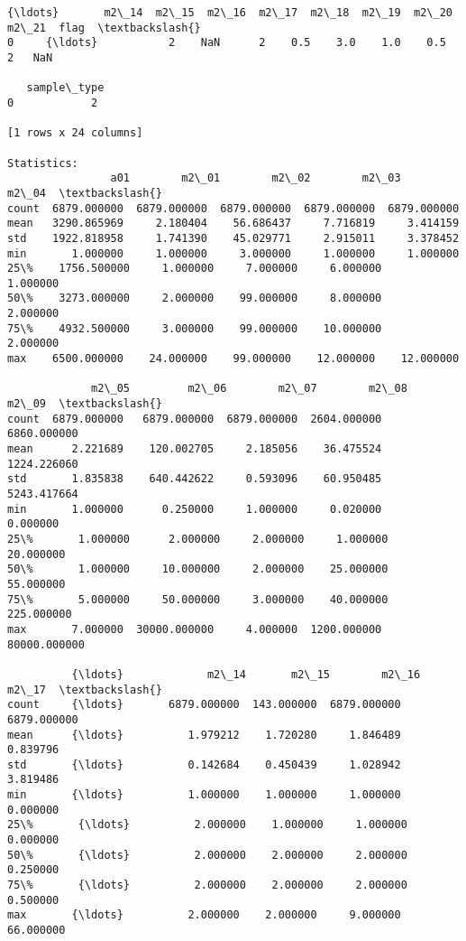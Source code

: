 \documentclass[11pt]{article}
\begin{document}
\begin{Verbatim}[commandchars=\\\{\}]
      {\ldots}       m2\_14  m2\_15  m2\_16  m2\_17  m2\_18  m2\_19  m2\_20  m2\_21  flag  \textbackslash{}
0     {\ldots}           2    NaN      2    0.5    3.0    1.0    0.5      2   NaN   

   sample\_type  
0            2  

[1 rows x 24 columns]

Statistics: 
                a01        m2\_01        m2\_02        m2\_03        m2\_04  \textbackslash{}
count  6879.000000  6879.000000  6879.000000  6879.000000  6879.000000   
mean   3290.865969     2.180404    56.686437     7.716819     3.414159   
std    1922.818958     1.741390    45.029771     2.915011     3.378452   
min       1.000000     1.000000     3.000000     1.000000     1.000000   
25\%    1756.500000     1.000000     7.000000     6.000000     1.000000   
50\%    3273.000000     2.000000    99.000000     8.000000     2.000000   
75\%    4932.500000     3.000000    99.000000    10.000000     2.000000   
max    6500.000000    24.000000    99.000000    12.000000    12.000000   

             m2\_05         m2\_06        m2\_07        m2\_08         m2\_09  \textbackslash{}
count  6879.000000   6879.000000  6879.000000  2604.000000   6860.000000   
mean      2.221689    120.002705     2.185056    36.475524   1224.226060   
std       1.835838    640.442622     0.593096    60.950485   5243.417664   
min       1.000000      0.250000     1.000000     0.020000      0.000000   
25\%       1.000000      2.000000     2.000000     1.000000     20.000000   
50\%       1.000000     10.000000     2.000000    25.000000     55.000000   
75\%       5.000000     50.000000     3.000000    40.000000    225.000000   
max       7.000000  30000.000000     4.000000  1200.000000  80000.000000   

          {\ldots}             m2\_14       m2\_15        m2\_16        m2\_17  \textbackslash{}
count     {\ldots}       6879.000000  143.000000  6879.000000  6879.000000   
mean      {\ldots}          1.979212    1.720280     1.846489     0.839796   
std       {\ldots}          0.142684    0.450439     1.028942     3.819486   
min       {\ldots}          1.000000    1.000000     1.000000     0.000000   
25\%       {\ldots}          2.000000    1.000000     1.000000     0.000000   
50\%       {\ldots}          2.000000    2.000000     2.000000     0.250000   
75\%       {\ldots}          2.000000    2.000000     2.000000     0.500000   
max       {\ldots}          2.000000    2.000000     9.000000    66.000000   


\end{Verbatim}
\end{document}
